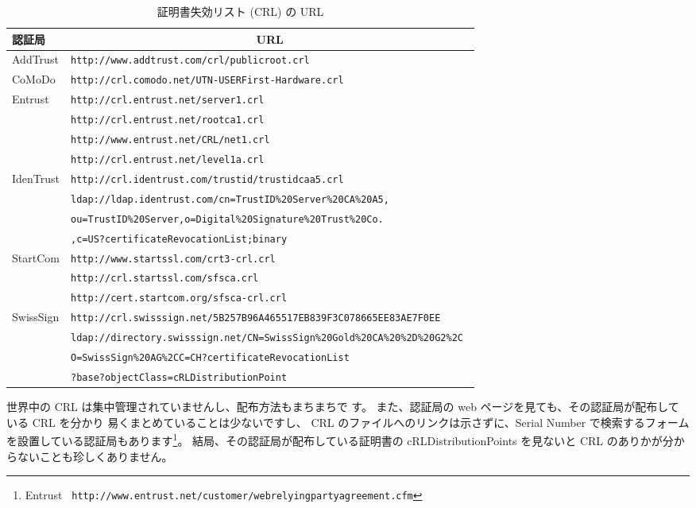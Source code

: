 \documentclass[mingoth,a4paper]{jsarticle}
\begin{document}
\begin{table}
\caption{証明書失効リスト (CRL) の URL}\label{tab:crlurl}
\begin{center}
\begin{tabular}{|l|l|}\hline
認証局 & \multicolumn{1}{c|}{URL} \\ \hline\hline
AddTrust & {\tt http://www.addtrust.com/crl/publicroot.crl} \\ \hline
CoMoDo & \tt http://crl.comodo.net/UTN-USERFirst-Hardware.crl \\ \hline
Entrust & \tt http://crl.entrust.net/server1.crl \\ \cline{2-2}
& \tt http://crl.entrust.net/rootca1.crl \\ \cline{2-2}
& \tt http://www.entrust.net/CRL/net1.crl \\ \cline{2-2}
&  \tt http://crl.entrust.net/level1a.crl \\ \hline
IdenTrust & \tt http://crl.identrust.com/trustid/trustidcaa5.crl \\ \cline{2-2}
 & \tt ldap://ldap.identrust.com/cn=TrustID\%20Server\%20CA\%20A5,\\
& \tt ou=TrustID\%20Server,o=Digital\%20Signature\%20Trust\%20Co. \\
& \tt ,c=US?certificateRevocationList;binary \\ \hline
StartCom & \tt http://www.startssl.com/crt3-crl.crl \\ \cline{2-2}
& \tt http://crl.startssl.com/sfsca.crl \\ \cline{2-2}
& \tt http://cert.startcom.org/sfsca-crl.crl \\ \hline
SwissSign & \tt http://crl.swisssign.net/5B257B96A465517EB839F3C078665EE83AE7F0EE \\ \cline{2-2}
& \tt ldap://directory.swisssign.net/CN=SwissSign\%20Gold\%20CA\%20\%2D\%20G2\%2C \\
& \tt O=SwissSign\%20AG\%2CC=CH?certificateRevocationList \\
	& \tt ?base?objectClass=cRLDistributionPoint \\ \hline
\end{tabular}
\end{center}
\end{table}

世界中の CRL は集中管理されていませんし、配布方法もまちまちで
す。
また、認証局の web ページを見ても、その認証局が配布している CRL を分かり
易くまとめていることは少ないですし、
CRL のファイルへのリンクは示さずに、Serial Number
で検索するフォームを設置している認証局もあります\footnote{Entrust \tt
http://www.entrust.net/customer/webrelyingpartyagreement.cfm}。
結局、その認証局が配布している証明書の cRLDistributionPoints を見ないと
CRL のありかが分からないことも珍しくありません。
\end{document}
